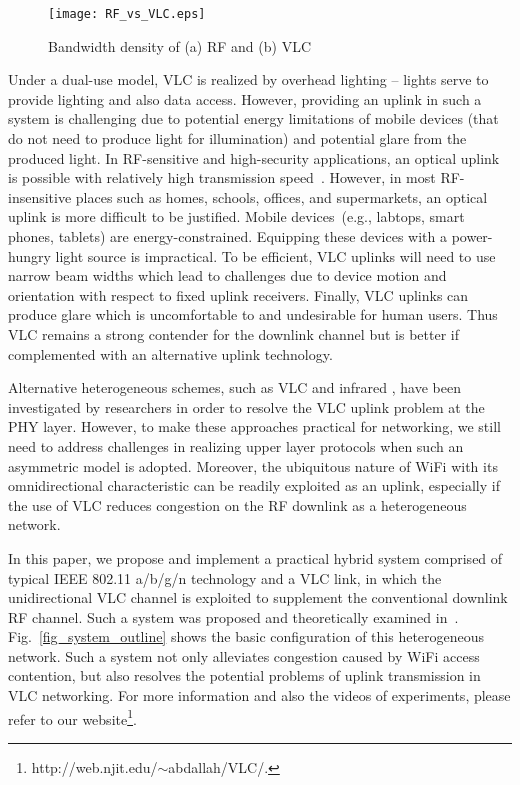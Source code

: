 \documentclass[10pt,journal]{IEEEtran}
\begin{document}
\begin{figure}
\centering
\texttt{[image: RF\_vs\_VLC.eps]}
\caption{Bandwidth density of (a) RF and (b) VLC}
\label{fig_RF_VS_VLC}
\end{figure}

Under a dual-use model, VLC is realized by overhead lighting -- lights
serve to provide lighting and also data access. However, providing an
uplink in such a system is challenging due to potential energy
limitations of mobile devices (that do not need to produce
light for illumination) and potential glare from the produced light.
In RF-sensitive and high-security applications, an optical uplink is
possible with relatively high transmission
speed~\cite{schmid2013led}. However, in most RF-insensitive places
such as homes, schools, offices, and supermarkets, an optical uplink
is more difficult to be justified. Mobile devices~(e.g., labtops, smart
phones, tablets) are energy-constrained. Equipping these devices with
a power-hungry light source is impractical. To be efficient, VLC
uplinks will need to use narrow beam widths which lead to challenges
due to device motion and orientation with respect to fixed uplink
receivers. Finally, VLC uplinks can produce glare which is
uncomfortable to and undesirable for human users. Thus VLC remains a
strong contender for the downlink channel but is better if
complemented with an alternative uplink technology.

Alternative heterogeneous schemes, such as VLC and infrared
\cite{langer2007recent}, have been investigated by researchers in
order to resolve the VLC uplink problem at the PHY layer. However, to
make these approaches practical for networking, we still need to address challenges
in realizing upper layer protocols when such an asymmetric model is
adopted. Moreover, the ubiquitous nature of WiFi with its
omnidirectional characteristic can be readily exploited as an
uplink, especially if the use of VLC reduces congestion on the RF downlink
as a heterogeneous network.

In this paper, we propose and implement a practical hybrid system
comprised of typical IEEE 802.11 a/b/g/n technology and a VLC link, in
which the unidirectional VLC channel is exploited to supplement the
conventional downlink RF channel. Such a system was proposed and
theoretically examined in~\cite{rahaim2011hybrid}. Fig.~\ref{fig_system_outline} shows the basic
configuration of this heterogeneous network.  Such a system not only
alleviates congestion caused by WiFi access contention, but also
resolves the potential problems of uplink transmission in VLC
networking. For more information and also the videos of experiments,
please refer to our website\footnote{http://web.njit.edu/$\sim$abdallah/VLC/.}.
\end{document}
